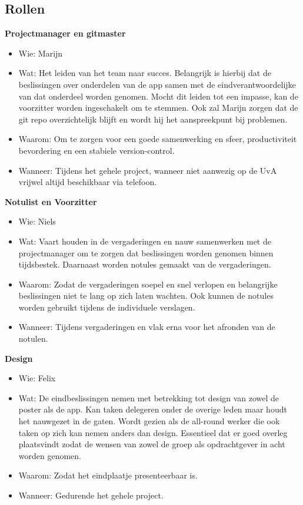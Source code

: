 \documentclass{uva-inf-article}
\begin{document}
\subsection{Rollen}
\textbf{Projectmanager en gitmaster}
\begin{itemize}
\item Wie: Marijn
\item Wat: Het leiden van het team naar succes. Belangrijk is hierbij dat de beslissingen over onderdelen van de app samen met de eindverantwoordelijke van dat onderdeel worden genomen. Mocht dit leiden tot een impasse, kan de voorzitter worden ingeschakelt om te stemmen. Ook zal Marijn zorgen dat de git repo overzichtelijk blijft en wordt hij het aanspreekpunt bij problemen.
\item Waarom: Om te zorgen voor een goede samenwerking en sfeer, productiviteit bevordering en een stabiele version-control.
\item Wanneer: Tijdens het gehele project, wanneer niet aanwezig op de UvA vrijwel altijd beschikbaar via telefoon.
\end{itemize}
\textbf{Notulist en Voorzitter}
\begin{itemize}
\item Wie: Niels
\item Wat: Vaart houden in de vergaderingen en nauw samenwerken met de projectmanager om te zorgen dat beslissingen worden genomen binnen tijdsbestek. Daarnaast worden notules gemaakt van de vergaderingen.
\item Waarom: Zodat de vergaderingen soepel en snel verlopen en belangrijke beslissingen niet te lang op zich laten wachten. Ook kunnen de notules worden gebruikt tijdens de individuele verslagen.
\item Wanneer: Tijdens vergaderingen en vlak erna voor het afronden van de notulen.
\end{itemize}
\textbf{Design}
\begin{itemize}
\item Wie: Felix
\item Wat: De eindbeslissingen nemen met betrekking tot design van zowel de poster als de app. Kan taken delegeren onder de overige leden maar houdt het nauwgezet in de gaten. Wordt gezien als de all-round werker die ook taken op zich kan nemen anders dan design. Essentieel dat er goed overleg plaatsvindt zodat de wensen van zowel de groep als opdrachtgever in acht worden genomen.
\item Waarom: Zodat het eindplaatje presenteerbaar is.
\item Wanneer: Gedurende het gehele project.
\end{itemize}
\end{document}
